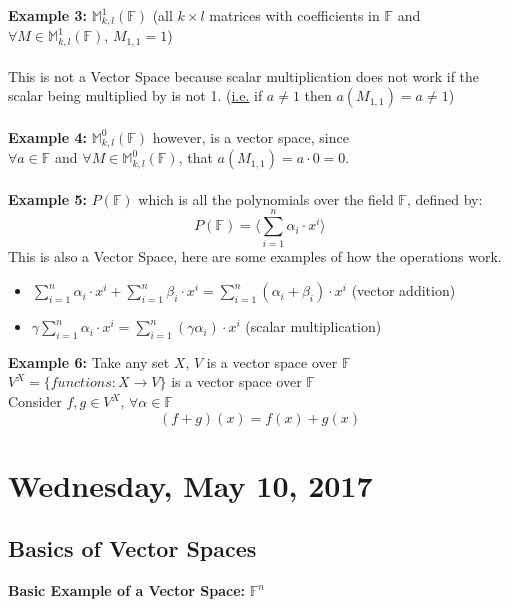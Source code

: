 \documentclass[12pt]{article}
\begin{document}
\textbf{Example 3:} $\mathbb{M}_{k,l}^{1}(\mathbb{F})$ (all $k \times l$ matrices with coefficients in $\mathbb{F}$ and $\forall M \in \mathbb{M}_{k,l}^{1}(\mathbb{F})$, $M_{1,1} = 1$)\\
\\
This is not a Vector Space because scalar multiplication does not work if the scalar being multiplied by is not 1. (\underline{i.e.} if $a \neq 1$ then $a(M_{1,1}) = a \neq 1$)\\
\\
\textbf{Example 4:} $\mathbb{M}_{k,l}^{0}(\mathbb{F})$ however, is a vector space, since\\ $\forall a \in\mathbb{F}$ and $\forall M \in \mathbb{M}_{k,l}^{0}(\mathbb{F})$, that $a(M_{1,1}) = a \cdot 0 = 0$.\\
\\
\textbf{Example 5:} $P(\mathbb{F})$ which is all the polynomials over the field $\mathbb{F}$, defined by:
$$P(\mathbb{F}) = \langle \sum_{i=1}^{n} {\alpha_i \cdot x^i} \rangle$$
This is also a Vector Space, here are some examples of how the operations work.
\begin{itemize}
	\item{$\sum_{i=1}^{n} {\alpha_i \cdot x^i} + \sum_{i=1}^{n} {\beta_i \cdot x^i} = \sum_{i=1}^{n} {(\alpha_i + \beta_i) \cdot x^i}$ (vector addition)}
	\item{$\gamma\sum_{i=1}^{n} {\alpha_i \cdot x^i} = \sum_{i=1}^{n} {(\gamma\alpha_i) \cdot x^i}$ (scalar multiplication)}
\end{itemize}

\textbf{Example 6:} Take any set $X$, $V$ is a vector space over $\mathbb{F}$\\
$V^X = \{ functions : X \longrightarrow V \}$ is a vector space over $\mathbb{F}$\\
Consider $f,g \in V^X$, $\forall \alpha \in \mathbb{F}$
$$(f + g)(x) = f(x) + g(x)$$

\newpage

\section{Wednesday, May 10, 2017}

\subsection{Basics of Vector Spaces}

\textbf{Basic Example of a Vector Space:} $\mathbb{F}^n$
\end{document}
